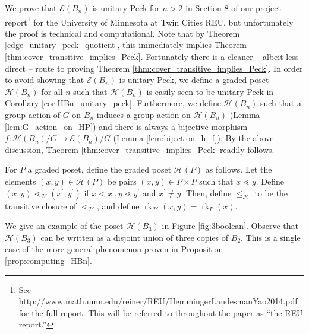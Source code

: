 \documentclass[smallextended, envcountsame, numbook]{svjour3}
\numberwithin{equation}{section}
\newcommand\rk{\operatorname{rk}}
\begin{document}
We prove that $\mathcal E(B_n)$ is unitary Peck for $n > 2$ in Section 8 of our project report\footnote{See http://www.math.umn.edu/reiner/REU/HemmingerLandesmanYao2014.pdf for the full report. This will be referred to throughout the paper as ``the REU report.''} for the University of Minnesota at Twin Cities REU, but unfortunately the proof is technical and computational. Note that by Theorem \ref{edge_unitary_peck_quotient}, this immediately implies Theorem \ref{thm:cover_transitive_implies_Peck}. Fortunately there is a cleaner -- albeit less direct -- route to proving Theorem \ref{thm:cover_transitive_implies_Peck}. In order to avoid showing that $\mathcal E(B_n)$ is unitary Peck, we define a graded poset $\mathcal{H}(B_n)$ for all $n$ such that $\mathcal{H}(B_n)$ is easily seen to be unitary Peck in Corollary \ref{cor:HBn_unitary_peck}. Furthermore, we define $\mathcal{H}(B_n)$ such that a group action of $G$ on $B_n$ induces a group action on $\mathcal{H}(B_n)$ (Lemma \ref{lem:G_action_on_HP}) and there is always a bijective morphism $f\colon \mathcal{H}(B_n)/G\rightarrow \mathcal E(B_n)/G$ (Lemma \ref{lem:bijection_h_f}).  By the above discussion, Theorem \ref{thm:cover_transitive_implies_Peck} readily follows.

\begin{definition}
\label{defn:h_map}
For $P$ a graded poset, define the graded poset $\mathcal H(P)$ as follows.  Let the elements $(x, y) \in \mathcal H(P)$ be pairs $(x,y) \in P\times P$ such that $x \lessdot y$.  Define $(x, y) \lessdot_{\mathcal H} (x^\prime, y^\prime)$ if $x \lessdot x^\prime,y\lessdot y^\prime$ and $x^\prime \neq y$.  Then, define $\leq_{\mathcal H}$ to be the transitive closure of $\lessdot_{\mathcal H}$, and define $\rk_{\mathcal H}(x, y) = \rk_P(x)$.
\end{definition}


\begin{example}
\label{eg:3boolean}
We give an example of the poset $\mathcal H(B_3)$ in Figure \ref{fig:3boolean}. Observe that $\mathcal H(B_3)$ can be written as a disjoint union of three copies of $B_2$. This is a single case of the more general phenomenon proven in Proposition \ref{prop:computing_HBn}.
\end{example}
\end{document}

